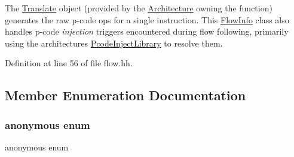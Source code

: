 The \mbox{\hyperlink{class_translate}{Translate}} object (provided by the \mbox{\hyperlink{class_architecture}{Architecture}} owning the function) generates the raw p-\/code ops for a single instruction. This \mbox{\hyperlink{class_flow_info}{Flow\+Info}} class also handles p-\/code {\itshape injection} triggers encountered during flow following, primarily using the architecture\textquotesingle{}s \mbox{\hyperlink{class_pcode_inject_library}{Pcode\+Inject\+Library}} to resolve them. 

Definition at line 56 of file flow.\+hh.



\subsection{Member Enumeration Documentation}
\mbox{\label{class_flow_info_a76909fdb45a32a5b570e61179bbce0ef}} 
\subsubsection{\texorpdfstring{anonymous enum}{anonymous enum}}
{\footnotesize\ttfamily anonymous enum}

